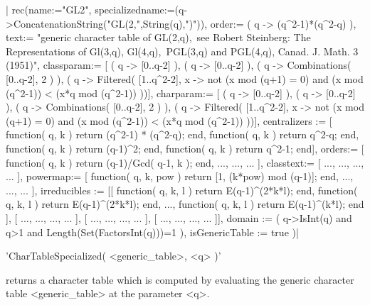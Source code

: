 |    rec(name:="GL2",
        specializedname:=(q->ConcatenationString("GL(2,",String(q),")")),
        order:= ( q -> (q^2-1)*(q^2-q) ),
        text:= "generic character table of GL(2,q),\
     see Robert Steinberg: The Representations of Gl(3,q), Gl(4,q),\
     PGL(3,q) and PGL(4,q), Canad. J. Math. 3 (1951)",
        classparam:= [ ( q -> [0..q-2] ), ( q -> [0..q-2] ),
                   ( q -> Combinations( [0..q-2], 2 ) ),
                   ( q -> Filtered( [1..q^2-2], x -> not (x mod (q+1) = 0)
                               and (x mod (q^2-1)) < (x*q mod (q^2-1)) ))],
        charparam:= [ ( q -> [0..q-2] ), ( q -> [0..q-2] ),
                  ( q -> Combinations( [0..q-2], 2 ) ),
                  ( q -> Filtered( [1..q^2-2], x -> not (x mod (q+1) = 0)
                               and (x mod (q^2-1)) < (x*q mod (q^2-1)) ))],
        centralizers := [ function( q, k ) return (q^2-1) * (q^2-q); end,
                          function( q, k ) return q^2-q; end,
                          function( q, k ) return (q-1)^2; end,
                          function( q, k ) return q^2-1; end],
        orders:= [ function( q, k ) return (q-1)/Gcd( q-1, k ); end,
                 ..., ..., ... ],
        classtext:= [ ..., ..., ..., ... ],
        powermap:=
               [ function( q, k, pow ) return [1, (k*pow) mod (q-1)]; end,
                 ..., ..., ... ],
        irreducibles := [[ function( q, k, l ) return E(q-1)^(2*k*l); end,
                       function( q, k, l ) return E(q-1)^(2*k*l); end,
                       ...,
                       function( q, k, l ) return E(q-1)^(k*l); end    ],
                         [ ..., ..., ..., ... ],
                         [ ..., ..., ..., ... ],
                         [ ..., ..., ..., ... ]],
        domain := ( q->IsInt(q) and q>1 and Length(Set(FactorsInt(q)))=1 ),
        isGenericTable := true )|

\index{tables!generic}

'CharTableSpecialized( <generic\_table>, <q> )'

returns a  character  table which  is computed by  evaluating the generic
character table <generic\_table> at the parameter <q>.

